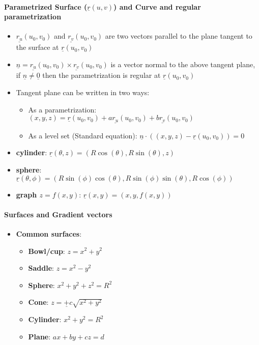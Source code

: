\documentclass[8pt, twocolumn]{article}
\begin{document}
\paragraph{Parametrized Surface ($\underline{r}(u, v)$) and Curve and regular parametrization}
\begin{itemize}
	\item $\underline{r_u}(u_0, v_0)$ and $\underline{r_v}(u_0, v_0)$ are two vectors parallel to the plane tangent to the surface at $\underline{r}(u_0, v_0)$
	\item  $\underline{n} =\underline{r_u}(u_0, v_0) \times \underline{r_v}(u_0, v_0)$ is a vector normal to the above tangent plane, if $\underline{n} \neq \underline{0}$ then the parametrization is regular at $\underline{r}(u_0, v_0)$
	\item Tangent plane can be written in two ways: 
	\begin{itemize}
		\item As a parametrization: $(x, y, z) = \underline{r}(u_0, v_0) + a\underline{r_u}(u_0, v_0) + b\underline{r_v}(u_0, v_0)$
		\item As a level set (Standard equation): $\underline{n} \cdot ((x, y, z) - \underline{r}(u_0, v_0)) = 0$
	\end{itemize}		
	\item \textbf{cylinder}: $\underline{r}(\theta, z) = (R\cos(\theta), R\sin(\theta), z)$
	\item \textbf{sphere}: $\underline{r}(\theta, \phi) = (R\sin(\phi)\cos(\theta), R\sin(\phi)\sin(\theta), R\cos(\phi))$
	\item \textbf{graph $z = f(x, y)$}: $\underline{r}(x, y) = (x, y, f(x, y))$

\end{itemize}


\paragraph{Surfaces and Gradient vectors}
	\begin{itemize}
		\item \textbf{Common surfaces}:
			\begin{itemize}
				\item \textbf{Bowl/cup}: $z = x^2 + y^2$ 
				\item \textbf{Saddle}: $z = x^2 - y^2$ 
				\item \textbf{Sphere}: $x^2 + y^2 + z^2 = R^2$ 
				\item \textbf{Cone}: $z = \underline{+} c\sqrt{x^2 + y^2}$
				\item \textbf{Cylinder}: $x^2 + y^2 = R^2$ 
				\item \textbf{Plane}: $ax + by + cz = d$
			\end{itemize}
	\end{itemize}
\end{document}
